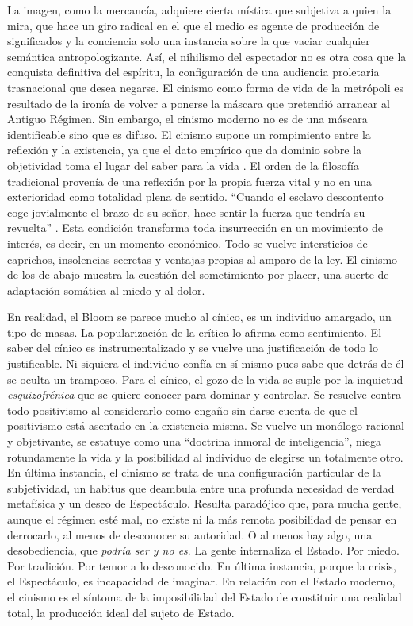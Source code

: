 La imagen, como la mercancía, adquiere cierta mística que subjetiva a quien la mira, que hace un giro radical en el que el medio es agente de producción de significados y la conciencia solo una instancia sobre la que vaciar cualquier semántica antropologizante. Así, el nihilismo del espectador no es otra cosa que la conquista definitiva del espíritu, la configuración de una audiencia proletaria trasnacional que desea negarse. El cinismo como forma de vida de la metrópoli es resultado de la ironía de volver a ponerse la máscara que pretendió arrancar al Antiguo Régimen. Sin embargo, el cinismo moderno no es de una máscara identificable sino que es difuso. El cinismo supone un rompimiento entre la reflexión y la existencia, ya que el dato empírico que da dominio sobre la objetividad toma el lugar del saber para la vida \autocite{onfrayCinismosRetratoFilosofos2005}. El orden de la filosofía tradicional provenía de una reflexión por la propia fuerza vital y no en una exterioridad como totalidad plena de sentido. \enquote{Cuando el esclavo descontento coge jovialmente el brazo de su señor, hace sentir la fuerza que tendría su revuelta} \autocite{sloterdijkCriticaRazonCinica2014}. Esta condición transforma toda insurrección en un movimiento de interés, es decir, en un momento económico. Todo se vuelve intersticios de caprichos, insolencias secretas y ventajas propias al amparo de la ley. El cinismo de los de abajo muestra la cuestión del sometimiento por placer, una suerte de adaptación somática al miedo y al dolor.

En realidad, el Bloom se parece mucho al cínico, es un individuo amargado, un tipo de masas. La popularización de la crítica lo afirma como sentimiento. El saber del cínico es instrumentalizado y se vuelve una justificación de todo lo justificable. Ni siquiera el individuo confía en sí mismo pues sabe que detrás de él se oculta un tramposo. Para el cínico, el gozo de la vida se suple por la inquietud \emph{esquizofrénica} que se quiere conocer para dominar y controlar. Se resuelve contra todo positivismo al considerarlo como engaño sin darse cuenta de que el positivismo está asentado en la existencia misma. Se vuelve un monólogo racional y objetivante, se estatuye como una \enquote{doctrina inmoral de inteligencia}, niega rotundamente la vida y la posibilidad al individuo de elegirse un totalmente otro. En última instancia, el cinismo se trata de una configuración particular de la subjetividad, un habitus que deambula entre una profunda necesidad de verdad metafísica y un deseo de Espectáculo. Resulta paradójico que, para mucha gente, aunque el régimen esté mal, no existe ni la más remota posibilidad de pensar en derrocarlo, al menos de desconocer su autoridad. O al menos hay algo, una desobediencia, que \emph{podría ser y no es}. La gente internaliza el Estado. Por miedo. Por tradición. Por temor a lo desconocido. En última instancia, porque la crisis, el Espectáculo, es incapacidad de imaginar. En relación con el Estado moderno, el cinismo es el síntoma de la imposibilidad del Estado de constituir una realidad total, la producción ideal del sujeto de Estado.

